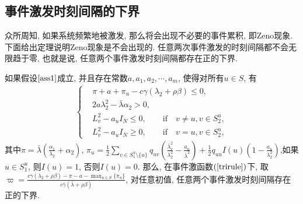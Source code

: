 \subsection{事件激发时刻间隔的下界}
        众所周知, 如果系统频繁地被激发, 那么将会出现不必要的事件累积, 即Zeno现象. 下面给出定理说明Zeno现象是不会出现的. 任意两次事件激发的时刻间隔都不会无限趋于零, 也就是说, 任意两个事件激发时刻间隔都存在正的下界.
        \begin{thm}\label{them2}
        如果假设$\ref{ass1}$成立, 并且存在常数$a,a_1,a_2,\cdots,a_m$, 使得对所有$u\in S$, 有
            \begin{align}\label{thm:2}
            \left\{
            \begin{aligned}
            &\pi+a+\pi_u-c\gamma(\lambda_2+\rho\beta)\leq0,\\
            &2a\lambda_2^2-\bar{\lambda}\alpha_2>0,\\
            &L^2_v-a_uI_N\leq 0, \quad\quad \text{if} \quad v\neq u, v\in S_2^u, \\
            &L^2_v-a_uI_N\geq 0, \quad\quad \text{if} \quad v= u, v\in S_2^u,
            \end{aligned}
            \right.
            \end{align}
        其中$\pi=\bar{\lambda}(\frac{\alpha_1}{\lambda_2}+\alpha_2)$, $\pi_u=\frac{1}{2}\sum_{v\in S_1^u\setminus\{u\}}q_{uv}(\frac{\bar{\lambda}^2_{v}}{\lambda_2^2}-\frac{a_u}{\bar{\lambda}^2})
        +\frac{1}{2}q_{uu}I(u)(1-\frac{a_u}{\lambda_2^2})$,如果$u\in S_1^u$, 则$I(u)=1$, 否则$I(u)=0$.
        那么, 在事件激函数$(\ref{trirule})$下, 取$\varpi=\frac{c\gamma(\lambda_2+\rho\beta)-\pi-a-\max_{u\in S}\{\pi_u\}}{c\bar\gamma(\bar\lambda+\rho\beta)}$, 对任意初值, 任意两个事件激发时刻间隔存在正的下界.
        \end{thm}
